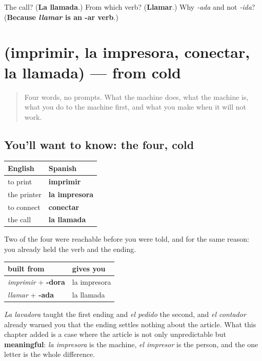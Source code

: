 \begin{tcolorbox}[breakable,colback=teal!4,colframe=teal!35!black,title={Before you move on}]
The call? (\textbf{La llamada}.) From which verb? (\textbf{Llamar}.) Why \emph{-ada} and not \emph{-ida}? (\textbf{Because \emph{llamar} is an -ar verb}.)
\end{tcolorbox}
\section[(imprimir, la impresora, conectar, la …]{(imprimir, la impresora, conectar, la llamada) — from cold}

\label{lesson:ES-R469-repaso-oficina}



\begin{quote}
Four words, no prompts. What the machine does, what the machine is, what you do to the machine first, and what you make when it will not work.
\end{quote}

\subsection*{You'll want to know: the four, cold}
\noindent
\begin{tabularx}{\linewidth}{@{}>{\raggedright\arraybackslash}X>{\raggedright\arraybackslash}X@{}}
\toprule
\textbf{English} & \textbf{Spanish} \\
\midrule
to print & \textbf{imprimir} \\
the printer & \textbf{la impresora} \\
to connect & \textbf{conectar} \\
the call & \textbf{la llamada} \\
\bottomrule
\end{tabularx}

\begin{grammarlens}[title={Grammar Lens: two of these you could have guessed}]
Two of the four were reachable before you were told, and for the same reason: you already held the verb and the ending.

\noindent
\begin{tabularx}{\linewidth}{@{}>{\raggedright\arraybackslash}X>{\raggedright\arraybackslash}X@{}}
\toprule
\textbf{built from} & \textbf{gives you} \\
\midrule
\emph{imprimir} + \textbf{-dora} & la impresora \\
\emph{llamar} + \textbf{-ada} & la llamada \\
\bottomrule
\end{tabularx}

\emph{La lavadora} taught the first ending and \emph{el pedido} the second, and \emph{el contador} already warned you that the ending settles nothing about the article. What this chapter added is a case where the article is not only unpredictable but \textbf{meaningful}: \emph{la impresora} is the machine, \emph{el impresor} is the person, and the one letter is the whole difference.
\end{grammarlens}

